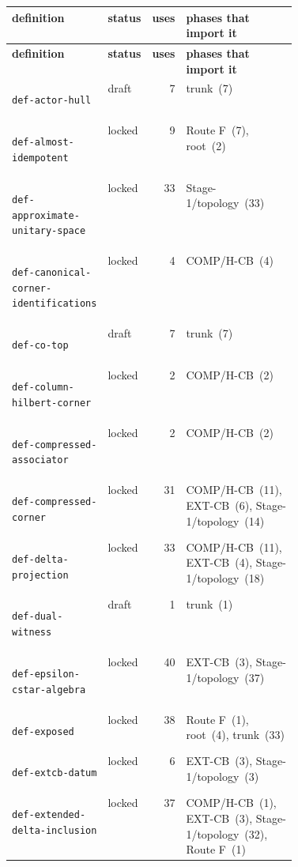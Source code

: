 \begin{longtable}{@{}l l r p{0.42\linewidth}@{}}
\toprule
\textbf{definition} & \textbf{status} & \textbf{uses} & \textbf{phases that import it} \\
\midrule\endfirsthead
\toprule \textbf{definition} & \textbf{status} & \textbf{uses} & \textbf{phases that import it} \\ \midrule\endhead
\bottomrule\endfoot
\hypertarget{dag:def-actor-hull}{}\texttt{def-actor-hull} & draft & 7 & trunk~(7) \\
\hypertarget{dag:def-almost-idempotent}{}\texttt{def-almost-idempotent} & locked & 9 & Route F~(7), root~(2) \\
\hypertarget{dag:def-approximate-unitary-space}{}\texttt{def-approximate-unitary-space} & locked & 33 & Stage-1/topology~(33) \\
\hypertarget{dag:def-canonical-corner-identifications}{}\texttt{def-canonical-corner-identifications} & locked & 4 & COMP/H-CB~(4) \\
\hypertarget{dag:def-co-top}{}\texttt{def-co-top} & draft & 7 & trunk~(7) \\
\hypertarget{dag:def-column-hilbert-corner}{}\texttt{def-column-hilbert-corner} & locked & 2 & COMP/H-CB~(2) \\
\hypertarget{dag:def-compressed-associator}{}\texttt{def-compressed-associator} & locked & 2 & COMP/H-CB~(2) \\
\hypertarget{dag:def-compressed-corner}{}\texttt{def-compressed-corner} & locked & 31 & COMP/H-CB~(11), EXT-CB~(6), Stage-1/topology~(14) \\
\hypertarget{dag:def-delta-projection}{}\texttt{def-delta-projection} & locked & 33 & COMP/H-CB~(11), EXT-CB~(4), Stage-1/topology~(18) \\
\hypertarget{dag:def-dual-witness}{}\texttt{def-dual-witness} & draft & 1 & trunk~(1) \\
\hypertarget{dag:def-epsilon-cstar-algebra}{}\texttt{def-epsilon-cstar-algebra} & locked & 40 & EXT-CB~(3), Stage-1/topology~(37) \\
\hypertarget{dag:def-exposed}{}\texttt{def-exposed} & locked & 38 & Route F~(1), root~(4), trunk~(33) \\
\hypertarget{dag:def-extcb-datum}{}\texttt{def-extcb-datum} & locked & 6 & EXT-CB~(3), Stage-1/topology~(3) \\
\hypertarget{dag:def-extended-delta-inclusion}{}\texttt{def-extended-delta-inclusion} & locked & 37 & COMP/H-CB~(1), EXT-CB~(3), Stage-1/topology~(32), Route F~(1) \\

\end{longtable}
